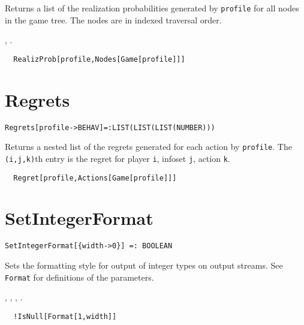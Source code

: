 \noindent
Returns a list of the realization probabilities generated by
\verb+profile+ for all nodes in the game tree.  The nodes are in indexed
traversal order.

\seealso
{},
.

\udfbody
\begin{verbatim}
  RealizProb[profile,Nodes[Game[profile]]]
\end{verbatim}


\section*{Regrets}\label{ExtRegrets}
\begin{verbatim}
Regrets[profile->BEHAV]=:LIST(LIST(LIST(NUMBER)))
\end{verbatim}

\noindent
Returns a nested list of the regrets generated for each action by
\verb+profile+.  The \verb+(i,j,k)+th entry is the regret for player
\verb+i+, infoset \verb+j+, action \verb+k+.

\udfbody
\begin{verbatim}
  Regret[profile,Actions[Game[profile]]]
\end{verbatim}


\section*{SetIntegerFormat}\label{ExtSetIntegerFormat}
\begin{verbatim}
SetIntegerFormat[{width->0}] =: BOOLEAN 
\end{verbatim}

\noindent
Sets the formatting style for output of integer types on output
streams.  See \verb+Format+ for definitions of the parameters.

\seealso
{},
,
,
.

\udfbody
\begin{verbatim}
  !IsNull[Format[1,width]]
\end{verbatim} 


